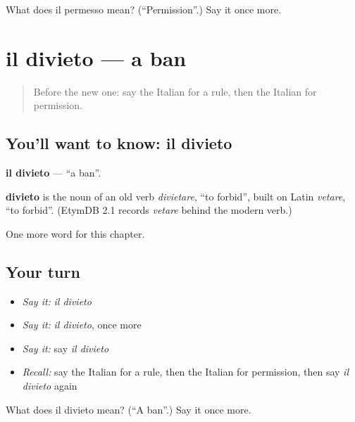 \begin{tcolorbox}[breakable,colback=teal!4,colframe=teal!35!black,title={Before you move on}]
What does il permesso mean? (\textquotedblleft{}Permission\textquotedblright{}.) Say it once more.
\end{tcolorbox}
\section[il divieto]{il divieto — a ban}

\label{lesson:IT-C165-divieto}



\begin{quote}
Before the new one: say the Italian for a rule, then the Italian for permission.
\end{quote}

\subsection*{You'll want to know: il divieto}
\textbf{il divieto} — \textquotedblleft{}a ban\textquotedblright{}.

\begin{cousinweb}
\textbf{divieto} is the noun of an old verb \emph{divietare}, \textquotedblleft{}to forbid\textquotedblright{}, built on Latin \emph{vetare}, \textquotedblleft{}to forbid\textquotedblright{}. (EtymDB 2.1 records \emph{vetare} behind the modern verb.)
\end{cousinweb}

\begin{grammarlens}[title={What you've built}]
One more word for this chapter.
\end{grammarlens}

\subsection*{Your turn}
\begin{itemize}
\raggedright
  \item \emph{Say it:} \emph{il divieto}
  \item \emph{Say it:} \emph{il divieto}, once more
  \item \emph{Say it:} say \emph{il divieto}
  \item \emph{Recall:} say the Italian for a rule, then the Italian for permission, then say \emph{il divieto} again
\end{itemize}

\begin{tcolorbox}[breakable,colback=teal!4,colframe=teal!35!black,title={Before you move on}]
What does il divieto mean? (\textquotedblleft{}A ban\textquotedblright{}.) Say it once more.
\end{tcolorbox}
